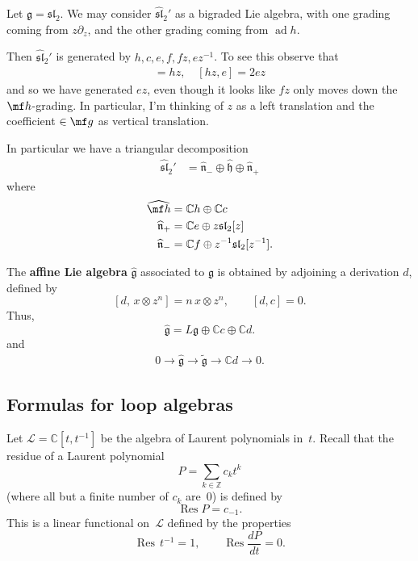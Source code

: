 \documentclass[12pt]{article}
\begin{document}
\begin{example}
    Let $\mathfrak{g} = \mathfrak{sl}_2$. We may consider $\widehat{\mathfrak{sl}}_2'$ as a bigraded Lie algebra, with one grading coming from $z\partial_z$, and the other grading coming from $\operatorname{ad} h$.

    Then $\widehat{\mathfrak{sl}}_2'$ is generated by $h, c, e, f, fz, ez^{-1}$. To see this observe that \begin{align*}
        [fz,e] = hz, \quad [hz,e] = 2ez
    \end{align*} and so we have generated $ez$, even though it looks like $fz$ only moves down the $\mf h$-grading. In particular, I'm thinking of $z$ as a left translation and the coefficient $\in \mf g$ as vertical translation.

    In particular we have a triangular decomposition \begin{align*}
        \widehat{\mathfrak{sl}}_2' & = \widehat{\mathfrak{n}}_- \oplus \widehat{\mathfrak{h}} \oplus \widehat{\mathfrak{n}}_+
    \end{align*} where \begin{align*}
        \widehat{\mf h}          & = \mathbb{C}h \oplus \mathbb{C}c                    \\
        \widehat{\mathfrak{n}}_+ & = \mathbb{C}e \oplus z\mathfrak{sl}_2[z]            \\
        \widehat{\mathfrak{n}}_- & = \mathbb{C}f \oplus z^{-1}\mathfrak{sl}_2[z^{-1}].
    \end{align*}
\end{example}

\begin{definition}
    The \textbf{affine Lie algebra} $\widehat{\mathfrak{g}}$ associated to $\mathfrak{g}$ is obtained by adjoining a derivation $d$, defined by
    \[
        [d,\, x \otimes z^n] = n\,x \otimes z^n,
        \qquad [d,c]=0.
    \]
    Thus,
    \[
        \widehat{\mathfrak{g}} = L\mathfrak{g} \oplus \mathbb{C}c \oplus \mathbb{C}d.
    \] and \begin{align*}
        0 \to \widehat{\mathfrak{g}} \to \widetilde{\mathfrak{g}} \to \mathbb{C}d \to 0.
    \end{align*}
\end{definition}
\subsection{Formulas for loop algebras}
Let $\mathcal{L} = \mathbb{C}[t, t^{-1}]$ be the algebra of Laurent polynomials in~$t$.
Recall that the residue of a Laurent polynomial
\[
    P = \sum_{k \in \mathbb{Z}} c_k t^k
\]
(where all but a finite number of $c_k$ are~$0$) is defined by
\[
    \operatorname{Res} P = c_{-1}.
\]
This is a linear functional on~$\mathcal{L}$ defined by the properties
\[
    \operatorname{Res}\, t^{-1} = 1,
    \qquad
    \operatorname{Res} \frac{dP}{dt} = 0.
\]
\end{document}

